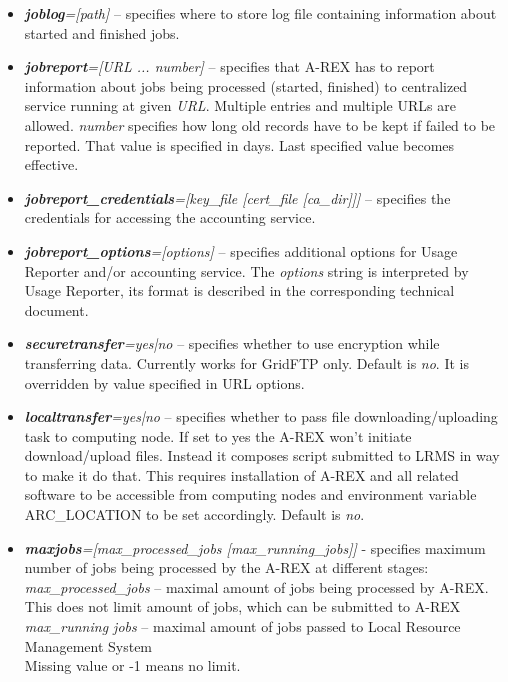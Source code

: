 \documentclass{article}                            %
\begin{document}
\begin{itemize}
\item \textbf{\textit{joblog}}\textit{={[}path]} -- specifies where to store
log file containing information about started and finished jobs.
\item \textbf{\textit{jobreport}}\textit{={[}URL ... number]} -- specifies
that A-REX has to report information about jobs being processed (started,
finished) to centralized service running at given \textit{URL}. Multiple
entries and multiple URLs are allowed. \textit{number} specifies how
long old records have to be kept if failed to be reported. That value
is specified in days. Last specified value becomes effective.
\item \textbf{\textit{jobreport\_credentials}}\textit{={[}key\_file
    {[}cert\_file {[}ca\_dir]]]} -- specifies the credentials for
  accessing the accounting service.
\item \textbf{\textit{jobreport\_options}}\textit{={[}options]}
  -- specifies additional options for Usage Reporter and/or
  accounting service. The \textit{options} string is interpreted by Usage
  Reporter, its format is described in the corresponding technical document.
\item \textbf{\textit{securetransfer}}\textit{=yes|no} -- specifies whether
to use encryption while transferring data. Currently works for GridFTP
only. Default is \emph{no}. It is overridden by value specified in
URL options.
\item \textbf{\textit{localtransfer}}\textit{=yes|no} -- specifies whether
to pass file downloading/uploading task to computing node. If set
to yes the A-REX won't initiate download/upload files. Instead it
composes script submitted to LRMS in way to make it do that. This
requires installation of A-REX and all related software to be accessible
from computing nodes and environment variable ARC\_LOCATION to be
set accordingly. Default is \emph{no}.
\item \textbf{\textit{maxjobs}}\textit{={[}max\_processed\_jobs {[}max\_running\_jobs]]}
- specifies maximum number of jobs being processed by the A-REX at
different stages:\\
\textit{max\_processed\_jobs} -- maximal amount of jobs being processed
by A-REX. This does not limit amount of jobs, which can be submitted
to A-REX\\
\textit{max\_running jobs} -- maximal amount of jobs passed to Local
Resource Management System\\
Missing value or -1 means no limit.

\end{itemize}
\end{document}
